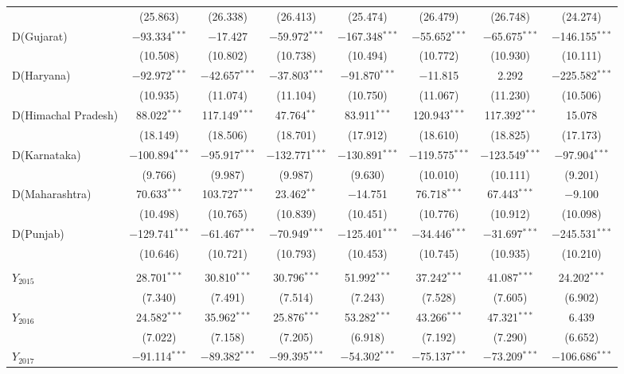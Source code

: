 \documentclass[12pt,a4paper]{article}
\begin{document}
\begin{table}[!ht]
{\begin{tabular}{lccccccc}
& (25.863) & (26.338) & (26.413) & (25.474) & (26.479) & (26.748) & (24.274) \\
D(Gujarat) & $-$93.334$^{***}$ & $-$17.427 & $-$59.972$^{***}$ & $-$167.348$^{***}$ & $-$55.652$^{***}$ & $-$65.675$^{***}$ & $-$146.155$^{***}$ \\
& (10.508) & (10.802) & (10.738) & (10.494) & (10.772) & (10.930) & (10.111) \\
D(Haryana) & $-$92.972$^{***}$ & $-$42.657$^{***}$ & $-$37.803$^{***}$ & $-$91.870$^{***}$ & $-$11.815 & 2.292 & $-$225.582$^{***}$ \\
& (10.935) & (11.074) & (11.104) & (10.750) & (11.067) & (11.230) & (10.506) \\
D(Himachal Pradesh) & 88.022$^{***}$ & 117.149$^{***}$ & 47.764$^{**}$ & 83.911$^{***}$ & 120.943$^{***}$ & 117.392$^{***}$ & 15.078 \\
& (18.149) & (18.506) & (18.701) & (17.912) & (18.610) & (18.825) & (17.173) \\
D(Karnataka) & $-$100.894$^{***}$ & $-$95.917$^{***}$ & $-$132.771$^{***}$ & $-$130.891$^{***}$ & $-$119.575$^{***}$ & $-$123.549$^{***}$ & $-$97.904$^{***}$ \\
& (9.766) & (9.987) & (9.987) & (9.630) & (10.010) & (10.111) & (9.201) \\
D(Maharashtra) & 70.633$^{***}$ & 103.727$^{***}$ & 23.462$^{**}$ & $-$14.751 & 76.718$^{***}$ & 67.443$^{***}$ & $-$9.100 \\
& (10.498) & (10.765) & (10.839) & (10.451) & (10.776) & (10.912) & (10.098) \\
D(Punjab) & $-$129.741$^{***}$ & $-$61.467$^{***}$ & $-$70.949$^{***}$ & $-$125.401$^{***}$ & $-$34.446$^{***}$ & $-$31.697$^{***}$ & $-$245.531$^{***}$ \\
& (10.646) & (10.721) & (10.793) & (10.453) & (10.745) & (10.935) & (10.210) \\ \hline
& & & & & & & \\
$Y_{2015}$ & 28.701$^{***}$ & 30.810$^{***}$ & 30.796$^{***}$ & 51.992$^{***}$ & 37.242$^{***}$ & 41.087$^{***}$ & 24.202$^{***}$ \\
& (7.340) & (7.491) & (7.514) & (7.243) & (7.528) & (7.605) & (6.902) \\
$Y_{2016}$ & 24.582$^{***}$ & 35.962$^{***}$ & 25.876$^{***}$ & 53.282$^{***}$ & 43.266$^{***}$ & 47.321$^{***}$ & 6.439 \\
& (7.022) & (7.158) & (7.205) & (6.918) & (7.192) & (7.290) & (6.652) \\
$Y_{2017}$ & $-$91.114$^{***}$ & $-$89.382$^{***}$ & $-$99.395$^{***}$ & $-$54.302$^{***}$ & $-$75.137$^{***}$ & $-$73.209$^{***}$ & $-$106.686$^{***}$ \\

\end{tabular}}
\end{table}
\end{document}
